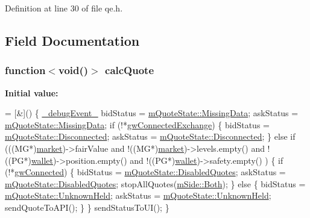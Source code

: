 Definition at line 30 of file qe.\+h.



\subsection{Field Documentation}
\subsubsection[{\texorpdfstring{calc\+Quote}{calcQuote}}]{\setlength{\rightskip}{0pt plus 5cm}function$<$void()$>$ calc\+Quote}\hypertarget{class_k_1_1_q_e_a7fa74fffe521ea33c7a4c9deaa606994}{}\label{class_k_1_1_q_e_a7fa74fffe521ea33c7a4c9deaa606994}
{\bfseries Initial value\+:}
\begin{DoxyCode}
= [&]() \{                          \hyperlink{ev_8h_ab96dcc845e16d51b3adbdb0cc9f39be1}{\_debugEvent\_}
        bidStatus = \hyperlink{namespace_k_a76b6774ff9252e574d375a353ecf6736afe155956e8f33e5cffa82cc86a36afbd}{mQuoteState::MissingData};
        askStatus = \hyperlink{namespace_k_a76b6774ff9252e574d375a353ecf6736afe155956e8f33e5cffa82cc86a36afbd}{mQuoteState::MissingData};
        \textcolor{keywordflow}{if} (!*\hyperlink{class_k_1_1_q_e_a6d9ed4a9793ac810eca371568ee912d3}{gwConnectedExchange}) \{
          bidStatus = \hyperlink{namespace_k_a3da250819294c55d5728586148bfa19eaef70e46fd3bbc21e3e1f0b6815e750c0}{mQuoteState::Disconnected};
          askStatus = \hyperlink{namespace_k_a3da250819294c55d5728586148bfa19eaef70e46fd3bbc21e3e1f0b6815e750c0}{mQuoteState::Disconnected};
        \} \textcolor{keywordflow}{else} \textcolor{keywordflow}{if} (((MG*)\hyperlink{class_k_1_1_klass_a98dbde943a8c48f1f266b879e5409777}{market})->fairValue
          and !((MG*)\hyperlink{class_k_1_1_klass_a98dbde943a8c48f1f266b879e5409777}{market})->levels.empty()
          and !((PG*)\hyperlink{class_k_1_1_klass_a5943d9c958085108c746fdc756c7aad3}{wallet})->position.empty()
          and !((PG*)\hyperlink{class_k_1_1_klass_a5943d9c958085108c746fdc756c7aad3}{wallet})->safety.empty()
        ) \{
          \textcolor{keywordflow}{if} (!*\hyperlink{class_k_1_1_q_e_a572945fdb3d861b6c685f6c5af9f1376}{gwConnected}) \{
            bidStatus = \hyperlink{namespace_k_a76b6774ff9252e574d375a353ecf6736a152243c591927afa2121aea8911cccd2}{mQuoteState::DisabledQuotes};
            askStatus = \hyperlink{namespace_k_a76b6774ff9252e574d375a353ecf6736a152243c591927afa2121aea8911cccd2}{mQuoteState::DisabledQuotes};
            stopAllQuotes(\hyperlink{namespace_k_a0b7d0fa0ffc9f87da1d6499cbcee7e94a130c5b3473c57faa76e2a1c54e26f88e}{mSide::Both});
          \} \textcolor{keywordflow}{else} \{
            bidStatus = \hyperlink{namespace_k_a76b6774ff9252e574d375a353ecf6736aa6dd615eded3f865e7f58d646d053222}{mQuoteState::UnknownHeld};
            askStatus = \hyperlink{namespace_k_a76b6774ff9252e574d375a353ecf6736aa6dd615eded3f865e7f58d646d053222}{mQuoteState::UnknownHeld};
            sendQuoteToAPI();
          \}
        \}
        sendStatusToUI();
      \}
\end{DoxyCode}


